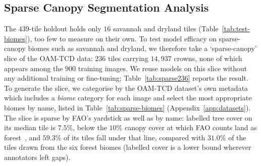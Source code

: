 \documentclass[remotesensing,article,submit,moreauthors]{Definitions/mdpi}
\begin{document}
\subsection{Sparse Canopy Segmentation Analysis}
The $439$-tile holdout holds only $16$ savannah and dryland tiles (Table~\ref{tab:test-biomes}), too few to measure on their own. To test model efficacy on sparse-canopy biomes such as savannah and dryland, we therefore take a `sparse-canopy' slice of the OAM-TCD data: $236$ tiles carrying $14{,}937$ crowns, none of which appears among the $900$ training images. We reuse models on this slice without any additional training or fine-tuning; Table~\ref{tab:sparse236} reports the result. To generate the slice, we categorise by the OAM-TCD dataset's own metadata which includes a \textit{biome} category for each image and select the most appropriate biomes by name, listed in Table~\ref{tab:sparse-biomes} (Appendix~\ref{app:datasets}). The slice is sparse by FAO's yardstick as well as by name: labelled tree cover on its median tile is $7.5\%$, below the $10\%$ canopy cover at which FAO counts land as forest~\cite{fao2018terms}, and $59.3\%$ of its tiles fall under that line, compared with $31.0\%$ of the tiles drawn from the six forest biomes (labelled cover is a lower bound wherever annotators left gaps).
\end{document}
